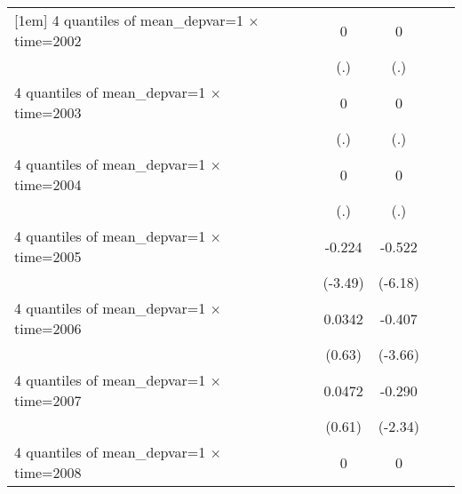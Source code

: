 \begin{table}[htbp]
\begin{tabular}{l*{6}{c}}
[1em]
4 quantiles of mean\_depvar=1 $\times$ time=2002&                     &                     &           0         &           0         &                     &                     \\
                    &                     &                     &         (.)         &         (.)         &                     &                     \\
[1em]
4 quantiles of mean\_depvar=1 $\times$ time=2003&                     &                     &           0         &           0         &                     &                     \\
                    &                     &                     &         (.)         &         (.)         &                     &                     \\
[1em]
4 quantiles of mean\_depvar=1 $\times$ time=2004&                     &                     &           0         &           0         &                     &                     \\
                    &                     &                     &         (.)         &         (.)         &                     &                     \\
[1em]
4 quantiles of mean\_depvar=1 $\times$ time=2005&                     &                     &      -0.224\sym{***}&      -0.522\sym{***}&                     &                     \\
                    &                     &                     &     (-3.49)         &     (-6.18)         &                     &                     \\
[1em]
4 quantiles of mean\_depvar=1 $\times$ time=2006&                     &                     &      0.0342         &      -0.407\sym{***}&                     &                     \\
                    &                     &                     &      (0.63)         &     (-3.66)         &                     &                     \\
[1em]
4 quantiles of mean\_depvar=1 $\times$ time=2007&                     &                     &      0.0472         &      -0.290\sym{**} &                     &                     \\
                    &                     &                     &      (0.61)         &     (-2.34)         &                     &                     \\
[1em]
4 quantiles of mean\_depvar=1 $\times$ time=2008&                     &                     &           0         &           0         &                     &                     \\

\end{tabular}
\end{table}

